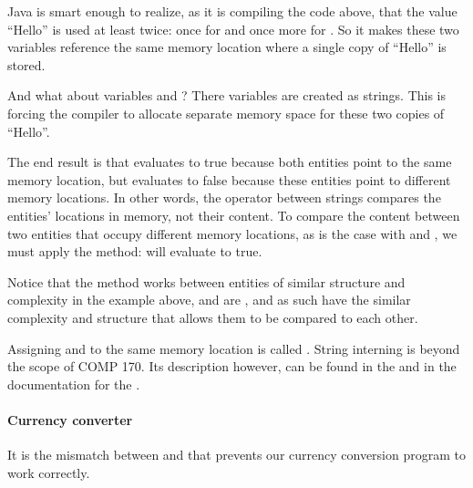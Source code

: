 \documentclass[letterpaper,10pt,english]{sphinxmanual}
\begin{document}
Java is smart enough to realize, as it is compiling the code above, that the value “Hello” is used at least twice: once for  and once more for . So it makes these two variables reference the same memory location where a single copy of “Hello” is stored.

And what about variables  and ? There variables are created as  strings. This is forcing the compiler to allocate separate memory space for these two copies of “Hello”.

The end result is that  evaluates to true because both entities point to the same memory location, but  evaluates to false because these entities point to different memory locations. In other words, the \sphinxcode{\sphinxupquote{==}} operator between strings compares the entities’ locations in memory, not their content. To compare the content between two entities that occupy different memory locations, as is the case with  and , we must apply the  method:  will evaluate to true.

Notice that the method  works between entities of similar structure and complexity \textendash{} in the example above,  and  are , and as such have the similar complexity and structure that allows them to be compared to each other.

Assigning  and  to the same memory location is called . String interning is beyond the scope of COMP 170. Its description however, can be found in the  and in the documentation for the .


\paragraph{Currency converter}
\label{\detokenize{COMP170/2020Spring/week3:currency-converter}}
It is the mismatch between  and  that prevents our currency conversion program to work correctly.
\end{document}
